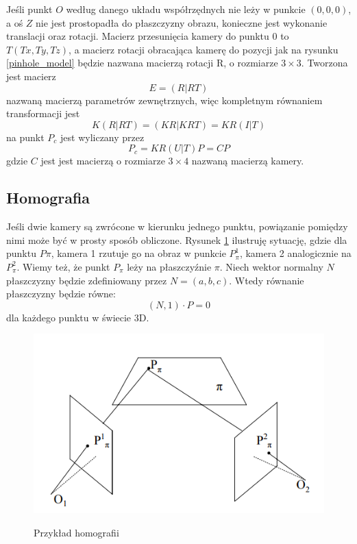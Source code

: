 \documentclass[12pt,twoside,polish]{article}
\begin{document}
Jeśli punkt $O$ według danego układu współrzędnych nie leży w punkcie $(0,0,0)$, a oś $Z$ nie jest prostopadła do płaszczyzny obrazu, konieczne jest wykonanie translacji oraz rotacji. Macierz przesunięcia kamery do punktu $0$ to $T(Tx, Ty, Tz)$, a macierz rotacji obracająca kamerę do pozycji jak na rysunku \ref{pinhole_model} będzie nazwana macierzą rotacji R, o rozmiarze $3 \times 3$. Tworzona jest macierz
$$
E = (R|RT)
$$
nazwaną macierzą parametrów zewnętrznych, więc kompletnym równaniem transformacji jest
$$ K(R|RT) = (KR|KRT) = KR(I|T)$$
na punkt $P_c$ jest wyliczany przez
$$P_c = KR(U|T)P = CP$$
gdzie $C$ jest jest macierzą o rozmiarze $3 \times 4$ nazwaną macierzą kamery.

\subsection{Homografia}
Jeśli dwie kamery są zwrócone w kierunku jednego punktu, powiązanie pomiędzy nimi może być w prosty sposób obliczone. Rysunek \ref{homography-label} ilustruję sytuację, gdzie dla punktu $P\pi$, kamera 1 rzutuje go na obraz w punkcie $P^1_\pi$, kamera 2 analogicznie na $P^2_\pi$. Wiemy też, że punkt $P_\pi$ leży na płaszczyźnie $\pi$. Niech wektor normalny $N$ płaszczyzny będzie zdefiniowany przez $N = (a,b,c)$. Wtedy równanie płaszczyzny będzie równe:
$$ (N, 1) \cdot P = 0 $$
dla każdego punktu w świecie 3D.

\begin{figure}[h]
	\centering	
	\includegraphics[width=\textwidth]{homography_img}
	\label{homography-label}
	\caption{Przykład homografii \cite{cameralib}}
\end{figure}
\end{document}
